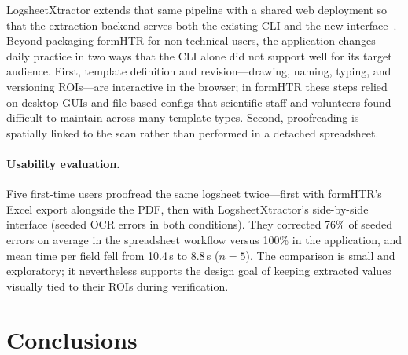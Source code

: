 \documentclass[preprint,12pt,a4paper]{elsarticle}
\begin{document}
LogsheetXtractor extends that same pipeline with a shared web deployment so that the extraction backend serves both the existing CLI and the new interface~\cite{formHTR_pr81}.
Beyond packaging formHTR for non-technical users, the application changes daily practice in two ways that the CLI alone did not support well for its target audience.
First, template definition and revision---drawing, naming, typing, and versioning ROIs---are interactive in the browser; in formHTR these steps relied on desktop GUIs and file-based configs that scientific staff and volunteers found difficult to maintain across many template types.
Second, proofreading is spatially linked to the scan rather than performed in a detached spreadsheet.

\paragraph{Usability evaluation.}
Five first-time users proofread the same logsheet twice---first with formHTR's Excel export alongside the PDF, then with LogsheetXtractor's side-by-side interface (seeded OCR errors in both conditions).
They corrected 76\% of seeded errors on average in the spreadsheet workflow versus 100\% in the application, and mean time per field fell from 10.4\,s to 8.8\,s ($n=5$).
The comparison is small and exploratory; it nevertheless supports the design goal of keeping extracted values visually tied to their ROIs during verification.


\section{Conclusions}
\label{sec:conclusions}

\end{document}
